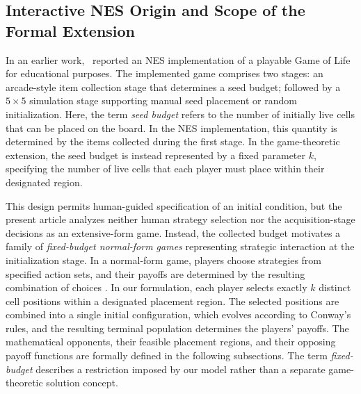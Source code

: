 \documentclass[games,article,submit,moreauthors]{Definitions/mdpi}
\begin{document}
\subsection{Interactive NES Origin and Scope of the Formal Extension}

In an earlier work,~\citet{senzio2026nes} reported an NES implementation of a playable Game of Life for educational purposes.
The implemented game comprises two stages: an arcade-style item collection stage that determines a seed budget; followed by a $5\times5$ simulation stage supporting manual seed placement or random initialization.
Here, the term \emph{seed budget} refers to the number of initially live cells that can be placed on the board.
In the NES implementation, this quantity is determined by the items collected during the first stage.
In the game-theoretic extension, the seed budget is instead represented by a fixed parameter $k$, specifying the number of live cells that each player must place within their designated region.

This design permits human-guided specification of an initial condition, but the present article analyzes neither human strategy selection nor the acquisition-stage decisions as an extensive-form game. Instead, the collected budget motivates a family of \emph{fixed-budget normal-form games} representing strategic interaction at the initialization stage. In a normal-form game, players choose strategies from specified action sets, and their payoffs are determined by the resulting combination of choices \citep{osborne1994course}. In our formulation, each player selects exactly $k$ distinct cell positions within a designated placement region. The selected positions are combined into a single initial configuration, which evolves according to Conway's rules, and the resulting terminal population determines the players' payoffs. The mathematical opponents, their feasible placement regions, and their opposing payoff functions are formally defined in the following subsections. The term \emph{fixed-budget} describes a restriction imposed by our model rather than a separate game-theoretic solution concept.
\end{document}
